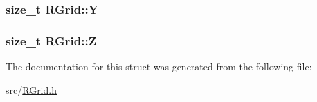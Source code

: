 \subsubsection[{Y}]{\setlength{\rightskip}{0pt plus 5cm}size\+\_\+t R\+Grid\+::\+Y}\label{struct_r_grid_aa24f14994d1fbd47f8dabf85c6364143}
\hypertarget{struct_r_grid_aa5276511c713a4fb0c4145af7ac321d0}{}
\subsubsection[{Z}]{\setlength{\rightskip}{0pt plus 5cm}size\+\_\+t R\+Grid\+::\+Z}\label{struct_r_grid_aa5276511c713a4fb0c4145af7ac321d0}


The documentation for this struct was generated from the following file\+:\begin{DoxyCompactItemize}
\item 
src/\hyperlink{_r_grid_8h}{R\+Grid.\+h}\end{DoxyCompactItemize}
